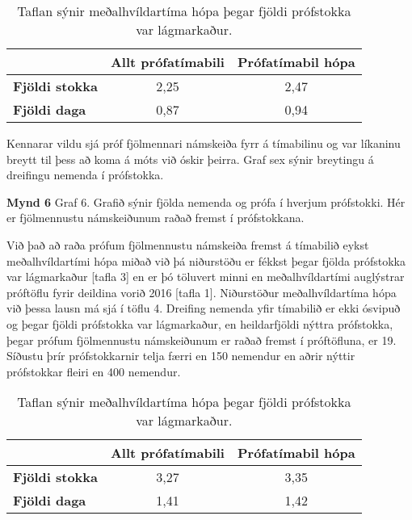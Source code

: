 \documentclass[12pt]{article}
\begin{document}
\begin{table}[h]
	\centering
	\label{my-label}
	\begin{tabular}{l|c|c|}
		\cline{2-3}
		& \multicolumn{1}{l|}{\textbf{Allt prófatímabili}} & \multicolumn{1}{l|}{\textbf{Prófatímabil hópa}} \\ \hline
		\multicolumn{1}{|l|}{\textbf{Fjöldi stokka}} & 2,25                                             & 2,47                                            \\ \hline
		\multicolumn{1}{|l|}{\textbf{Fjöldi daga}}   & 0,87                                             & 0,94                                            \\ \hline
	\end{tabular}
	\caption{Taflan sýnir meðalhvíldartíma hópa þegar fjöldi  prófstokka var lágmarkaður.}
\end{table}

Kennarar vildu sjá próf fjölmennari námskeiða fyrr á tímabilinu og var líkaninu breytt til þess að koma á móts við óskir þeirra. Graf sex sýnir breytingu á dreifingu nemenda í prófstokka.

\bigskip

\textbf{Mynd 6}
Graf 6. Grafið sýnir fjölda nemenda og prófa í hverjum prófstokki. Hér er fjölmennustu námskeiðunum raðað fremst í prófstokkana.

\bigskip

Við það að raða prófum fjölmennustu námskeiða fremst á tímabilið eykst meðalhvíldartími hópa miðað við þá niðurstöðu er fékkst þegar fjölda prófstokka var lágmarkaður [tafla 3] en er þó töluvert minni en meðalhvíldartími auglýstrar próftöflu fyrir deildina vorið 2016 [tafla 1]. Niðurstöður meðalhvíldartíma hópa við þessa lausn má sjá í töflu 4.
Dreifing nemenda yfir tímabilið er ekki ósvipuð og þegar fjöldi prófstokka var lágmarkaður, en heildarfjöldi nýttra prófstokka, þegar prófum fjölmennustu námskeiðunum er raðað fremst í próftöfluna, er 19. Síðustu þrír prófstokkarnir telja færri en 150 nemendur en aðrir nýttir prófstokkar fleiri en 400 nemendur.

\begin{table}[h]
	\centering
	\label{my-label}
	\begin{tabular}{l|c|c|}
		\cline{2-3}
		& \multicolumn{1}{l|}{\textbf{Allt prófatímabili}} & \multicolumn{1}{l|}{\textbf{Prófatímabil hópa}} \\ \hline
		\multicolumn{1}{|l|}{\textbf{Fjöldi stokka}} & 3,27                                             & 3,35                                            \\ \hline
		\multicolumn{1}{|l|}{\textbf{Fjöldi daga}}   & 1,41                                             & 1,42                                            \\ \hline
	\end{tabular}
	\caption{Taflan sýnir meðalhvíldartíma hópa þegar fjöldi  prófstokka var lágmarkaður.}
\end{table}
\end{document}

